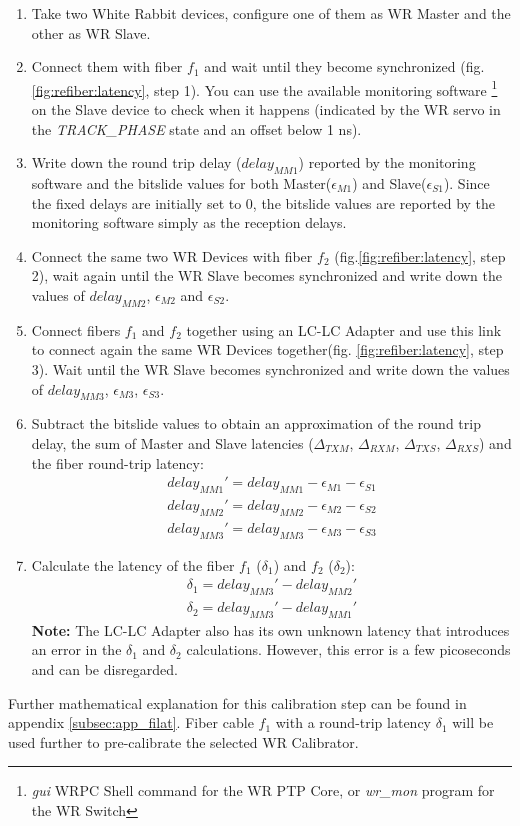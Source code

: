 \begin{enumerate}
	\item Take two White Rabbit devices, configure one of them as WR Master 
		and the other as WR Slave. 
	\item Connect them with fiber $f_1$ and wait until they become 
		synchronized (fig.\ref{fig:refiber:latency}, step 1). You can 
		use the available monitoring software \footnote{\emph{gui} WRPC 
		Shell command for the WR PTP Core, or \emph{wr\_mon} program for the WR 
		Switch} on the Slave device to check when it happens (indicated by 
		the WR servo in the \emph{TRACK\_PHASE} state and an offset below 1 ns).
	\item Write down the round trip delay ($delay_{MM1}$) reported by
		the monitoring software and the bitslide values for both
		Master($\epsilon_{M1}$) and Slave($\epsilon_{S1}$). Since the fixed delays
    are initially set to 0, the bitslide values are reported by the monitoring
		software simply as the reception delays.
	\item Connect the same two WR Devices with fiber $f_2$
		(fig.\ref{fig:refiber:latency}, step 2), wait again until the WR Slave
		becomes synchronized and write down the values of
		$delay_{MM2}$, $\epsilon_{M2}$ and $\epsilon_{S2}$.
	\item Connect fibers $f_1$ and $f_2$ together using an LC-LC Adapter and use
		this link to connect again the same WR Devices together(fig.
		\ref{fig:refiber:latency}, step 3). Wait until the WR Slave becomes 
		synchronized and write down the values of $delay_{MM3}$, 
		$\epsilon_{M3}$, $\epsilon_{S3}$.
	\item Subtract the bitslide values to obtain an approximation of the round
		trip delay, the sum of Master and Slave latencies ($\Delta_{TXM}$,
		$\Delta_{RXM}$, $\Delta_{TXS}$, $\Delta_{RXS}$) and the fiber round-trip
		latency:
		\begin{align}
			\label{equ:refiber:delmmeps1}
			delay_{MM1}' = delay_{MM1} - \epsilon_{M1} -
			\epsilon_{S1} \\
			\label{equ:refiber:delmmeps2}
			delay_{MM2}' = delay_{MM2} - \epsilon_{M2} -
			\epsilon_{S2} \\
			\label{equ:refiber:delmmeps3}
			delay_{MM3}' = delay_{MM3} - \epsilon_{M3} -
			\epsilon_{S3}
		\end{align}
	\item Calculate the latency of the fiber $f_1$ ($\delta_1$) and $f_2$
		($\delta_2$):
		\begin{align}
			\delta_1 = delay_{MM3}' - delay_{MM2}' \\
			\delta_2 = delay_{MM3}' - delay_{MM1}'
		\end{align}
		{\bf Note:} The LC-LC Adapter also has its own unknown latency that
		introduces an error in the $\delta_1$ and $\delta_2$ calculations.
		However, this error is a few picoseconds and can be disregarded.
\end{enumerate}
Further mathematical explanation for this calibration step can be found in
appendix \ref{subsec:app_filat}. Fiber cable $f_1$ with a round-trip latency
$\delta_1$ will be used further to pre-calibrate the selected WR Calibrator.

